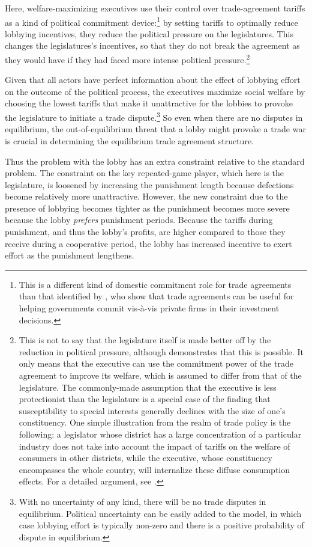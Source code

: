 \documentclass[authoryear, review]{elsarticle}
\begin{document}
Here, welfare-maximizing executives use their control over trade-agreement tariffs as a kind of political commitment device:\footnote{This is a different kind of domestic commitment role for trade agreements than that identified by \citet{mrc2007}, who show that trade agreements can be useful for helping governments commit vis-\`{a}-vis private firms in their investment decisions.} by setting tariffs to optimally reduce lobbying incentives, they reduce the political pressure on the legislatures. This changes the legislatures's incentives, so that they do not break the agreement as they would have if they had faced more intense political pressure.\footnote{This is not to say that the legislature itself is made better off by the reduction in political pressure, although \citet{buzard2014} demonstrates that this is possible. It only means that the executive can use the commitment power of the trade agreement to improve its welfare, which is assumed to differ from that of the legislature. The commonly-made assumption that the executive is less protectionist than the legislature is a special case of the finding that susceptibility to special interests generally declines with the size of one's constituency. One simple illustration from the realm of trade policy is the following: a legislator whose district has a large concentration of a particular industry does not take into account the impact of tariffs on the welfare of consumers in other districts, while the executive, whose constituency encompasses the whole country, will internalize these diffuse consumption effects. For a detailed argument, see \citet{lohohal}.\label{fn:ga_l_e3}}

Given that all actors have perfect information about the effect of lobbying effort on the outcome of the political process, the executives maximize social welfare by choosing the lowest tariffs that make it unattractive for the lobbies to provoke the legislature to initiate a trade dispute.\footnote{With no uncertainty of any kind, there will be no trade disputes in equilibrium. Political uncertainty can be easily added to the model, in which case lobbying effort is typically non-zero and there is a positive probability of dispute in equilibrium.} So even when there are no disputes in equilibrium, the out-of-equilibrium threat that a lobby might provoke a trade war is crucial in determining the equilibrium trade agreement structure.

Thus the problem with the lobby has an extra constraint relative to the standard problem. The constraint on the key repeated-game player, which here is the legislature, is loosened by increasing the punishment length because defections become relatively more unattractive. However, the new constraint due to the presence of lobbying becomes tighter as the punishment becomes more severe because the lobby \textit{prefers} punishment periods. Because the tariffs during punishment, and thus the lobby's profits, are higher compared to those they receive during a cooperative period, the lobby has increased incentive to exert effort as the punishment lengthens.
\end{document}
